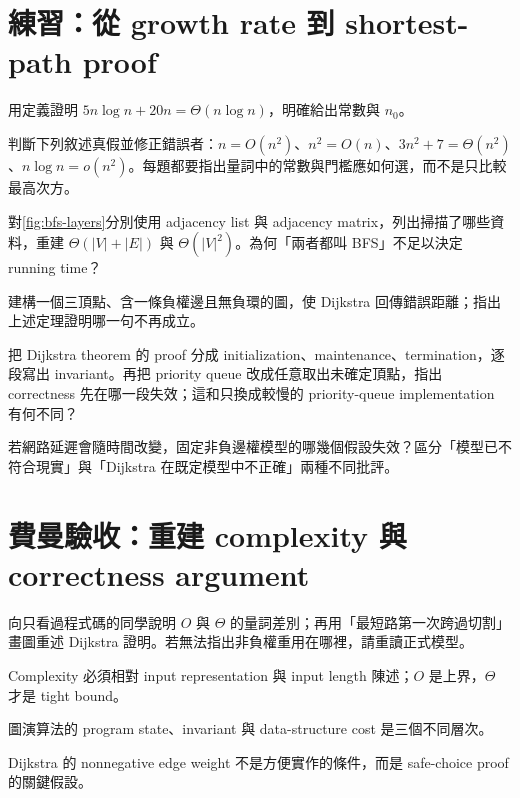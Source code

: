 \documentclass[11pt,a4paper,oneside,openany]{book}
\begin{document}
\section{練習：從 growth rate 到 shortest-path proof}
\begin{exercise}
\label{ex:asymptotic-proof}
用定義證明 $5n\log n+20n=\Theta(n\log n)$，明確給出常數與 $n_0$。
\end{exercise}
\begin{exercise}
判斷下列敘述真假並修正錯誤者：$n=O(n^2)$、$n^2=O(n)$、$3n^2+7=\Theta(n^2)$、$n\log n=o(n^2)$。每題都要指出量詞中的常數與門檻應如何選，而不是只比較最高次方。
\end{exercise}
\begin{exercise}
對\cref{fig:bfs-layers}分別使用 adjacency list 與 adjacency matrix，列出掃描了哪些資料，重建 $\Theta(|V|+|E|)$ 與 $\Theta(|V|^2)$。為何「兩者都叫 BFS」不足以決定 running time？
\end{exercise}
\begin{exercise}
\label{ex:dijkstra-negative}
建構一個三頂點、含一條負權邊且無負環的圖，使 Dijkstra 回傳錯誤距離；指出上述定理證明哪一句不再成立。
\end{exercise}
\begin{exercise}
把 Dijkstra theorem 的 proof 分成 initialization、maintenance、termination，逐段寫出 invariant。再把 priority queue 改成任意取出未確定頂點，指出 correctness 先在哪一段失效；這和只換成較慢的 priority-queue implementation 有何不同？
\end{exercise}
\begin{exercise}
若網路延遲會隨時間改變，固定非負邊權模型的哪幾個假設失效？區分「模型已不符合現實」與「Dijkstra 在既定模型中不正確」兩種不同批評。
\end{exercise}

\section{費曼驗收：重建 complexity 與 correctness argument}
\begin{feynmancheck}
向只看過程式碼的同學說明 $O$ 與 $\Theta$ 的量詞差別；再用「最短路第一次跨過切割」畫圖重述 Dijkstra 證明。若無法指出非負權重用在哪裡，請重讀正式模型。
\end{feynmancheck}
\begin{chapterrecap}
\item Complexity 必須相對 input representation 與 input length 陳述；$O$ 是上界，$\Theta$ 才是 tight bound。
\item 圖演算法的 program state、invariant 與 data-structure cost 是三個不同層次。
\item Dijkstra 的 nonnegative edge weight 不是方便實作的條件，而是 safe-choice proof 的關鍵假設。
\end{chapterrecap}
\end{document}
